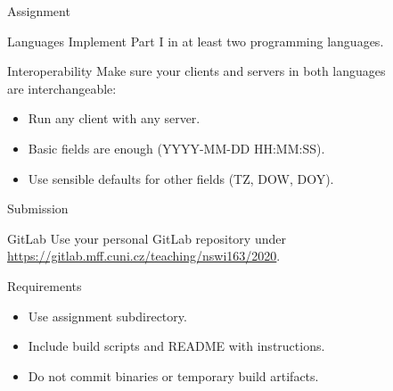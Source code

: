 \begin{frame}{Assignment}
    \begin{block}{Languages}
        Implement Part I in at least two programming languages.
    \end{block}

    \bigskip

    \begin{block}{Interoperability}
        Make sure your clients and servers in both languages \\ are interchangeable:
        \begin{itemize}
            \item Run any client with any server.
            \item Basic fields are enough (YYYY-MM-DD HH:MM:SS).
            \item Use sensible defaults for other fields (TZ, DOW, DOY).
        \end{itemize}
    \end{block}
\end{frame}


\begin{frame}{Submission}
    \begin{block}{GitLab}
        Use your personal GitLab repository under \\
        \url{https://gitlab.mff.cuni.cz/teaching/nswi163/2020}.
    \end{block}
    \begin{block}{Requirements}
        \begin{itemize}
            \item Use assignment subdirectory.
            \item Include build scripts and README with instructions.
            \item Do not commit binaries or temporary build artifacts.
        \end{itemize}
    \end{block}
\end{frame}
